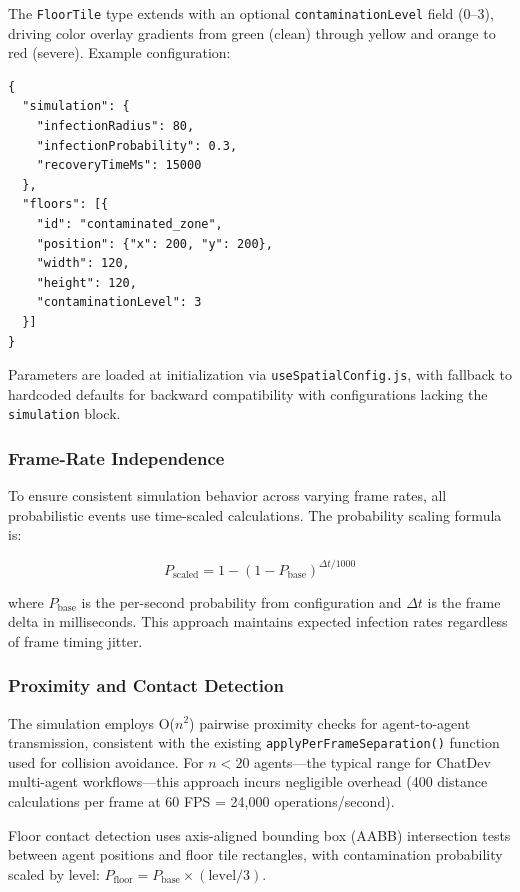 The \texttt{FloorTile} type extends with an optional \texttt{contaminationLevel} field (0--3), driving color overlay gradients from green (clean) through yellow and orange to red (severe). Example configuration:

\begin{verbatim}
{
  "simulation": {
    "infectionRadius": 80,
    "infectionProbability": 0.3,
    "recoveryTimeMs": 15000
  },
  "floors": [{
    "id": "contaminated_zone",
    "position": {"x": 200, "y": 200},
    "width": 120,
    "height": 120,
    "contaminationLevel": 3
  }]
}
\end{verbatim}

Parameters are loaded at initialization via \texttt{useSpatialConfig.js}, with fallback to hardcoded defaults for backward compatibility with configurations lacking the \texttt{simulation} block.

\subsubsection{Frame-Rate Independence}
\label{sec:frame-rate}

To ensure consistent simulation behavior across varying frame rates, all probabilistic events use time-scaled calculations. The probability scaling formula is:

\begin{equation}
P_{\text{scaled}} = 1 - (1 - P_{\text{base}})^{\Delta t / 1000}
\end{equation}

where $P_{\text{base}}$ is the per-second probability from configuration and $\Delta t$ is the frame delta in milliseconds. This approach maintains expected infection rates regardless of frame timing jitter.

\subsubsection{Proximity and Contact Detection}
\label{sec:proximity-detection}

The simulation employs O($n^2$) pairwise proximity checks for agent-to-agent transmission, consistent with the existing \texttt{applyPerFrameSeparation()} function used for collision avoidance. For $n < 20$ agents---the typical range for ChatDev multi-agent workflows---this approach incurs negligible overhead (400 distance calculations per frame at 60 FPS = 24,000 operations/second).

Floor contact detection uses axis-aligned bounding box (AABB) intersection tests between agent positions and floor tile rectangles, with contamination probability scaled by level: $P_{\text{floor}} = P_{\text{base}} \times (\text{level} / 3)$.

